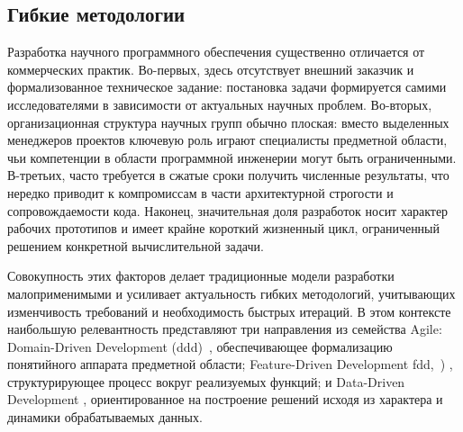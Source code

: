 \subsection{Гибкие методологии}

Разработка научного программного обеспечения существенно отличается от
коммерческих практик. Во-первых, здесь отсутствует внешний заказчик
и формализованное техническое задание: постановка задачи формируется
самими исследователями в зависимости от актуальных научных проблем.
Во-вторых, организационная структура научных групп обычно плоская:
вместо выделенных менеджеров проектов ключевую роль играют специалисты
предметной области, чьи компетенции в области программной инженерии
могут быть ограниченными. В-третьих, часто требуется в сжатые сроки
получить численные результаты, что нередко приводит к компромиссам
в части архитектурной строгости и сопровождаемости кода. Наконец,
значительная доля разработок носит характер рабочих прототипов и
имеет крайне короткий жизненный цикл, ограниченный решением
конкретной вычислительной задачи.

Совокупность этих факторов делает традиционные модели разработки
малоприменимыми и усиливает актуальность гибких методологий,
учитывающих изменчивость требований и необходимость быстрых
итераций. В этом контексте наибольшую релевантность представляют
три направления из семейства Agile: Domain-Driven Development %
(\acrshort{ddd})~\cite{vernon-DDD},
обеспечивающее формализацию понятийного аппарата предметной
области; Feature-Driven Development \acrshort{fdd},~\cite{coad1999java-fdd})
, структурирующее процесс
вокруг реализуемых функций; и Data-Driven Development \cite{Treleaven1982ddd, llopis2009ddd},
ориентированное на построение решений исходя из характера и
динамики обрабатываемых данных.

